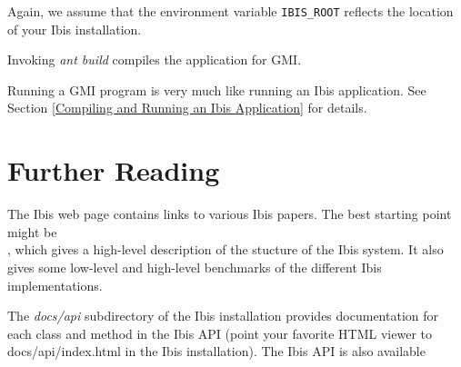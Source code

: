 \documentclass[10pt]{article}
\newcommand{\mysection}[1]{\section{#1}\label{#1}}
\begin{document}
Again, we assume that the environment variable \texttt{IBIS\_ROOT} reflects
the location of your Ibis installation.

Invoking \emph{ant build} compiles the application for GMI.

Running a GMI program is very much like running an Ibis application.
See Section \ref{Compiling and Running an Ibis Application} for details.


\mysection{Further Reading}

The Ibis web page
{}
{}
contains links to various Ibis papers.
The best starting point might be \\
{}
{}, which gives a high-level description of the stucture of the Ibis system.
It also gives some low-level and high-level benchmarks of the different Ibis implementations.

The \emph{docs/api} subdirectory of the Ibis installation provides
documentation for each class and method in the Ibis API (point your favorite
HTML viewer to docs/api/index.html in the Ibis installation).
The Ibis API is also available
\end{document}

